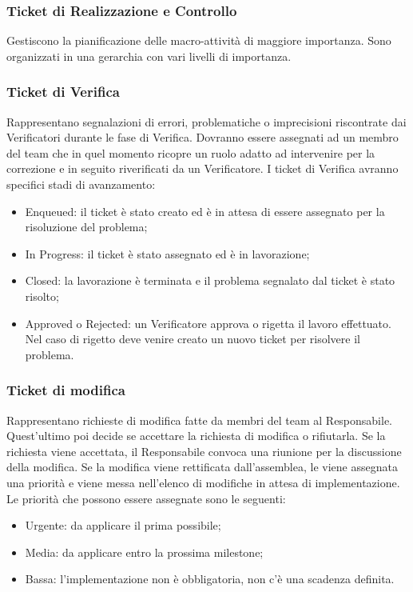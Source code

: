 \subsubsection{Ticket di Realizzazione e Controllo}
\label{8.4.2}
Gestiscono la pianificazione delle macro-attività di maggiore importanza. Sono organizzati in una gerarchia con vari livelli di importanza.

\subsubsection{Ticket di Verifica}
\label{8.4.3}
Rappresentano segnalazioni di errori, problematiche o imprecisioni riscontrate dai Verificatori durante le fase di Verifica. Dovranno essere assegnati ad un membro del team che in quel momento ricopre un ruolo adatto ad intervenire per la correzione e in seguito riverificati da un Verificatore.
I ticket di Verifica avranno specifici stadi di avanzamento:
\begin{itemize}
\item Enqueued: il ticket è stato creato ed è in attesa di essere assegnato per la risoluzione del problema;
\item In Progress: il ticket è stato assegnato ed è in lavorazione;
\item Closed: la lavorazione è terminata e il problema segnalato dal ticket è stato risolto;
\item Approved o Rejected: un Verificatore approva o rigetta il lavoro effettuato. Nel caso di rigetto deve venire creato un nuovo ticket per risolvere il problema.
\end{itemize}

\subsubsection{Ticket di modifica}
\label{8.4.4}
Rappresentano richieste di modifica fatte da membri del team al Responsabile. Quest'ultimo poi decide se accettare la richiesta di modifica o rifiutarla. Se la richiesta viene accettata, il Responsabile convoca una riunione per la discussione della modifica. Se la modifica viene rettificata dall'assemblea, le viene assegnata una priorità e viene messa nell'elenco di modifiche in attesa di implementazione.
Le priorità che possono essere assegnate sono le seguenti:
\begin{itemize}
\item Urgente: da applicare il prima possibile;
\item Media: da applicare entro la prossima milestone;
\item Bassa: l'implementazione non è obbligatoria, non c'è una scadenza definita.
\end{itemize}

